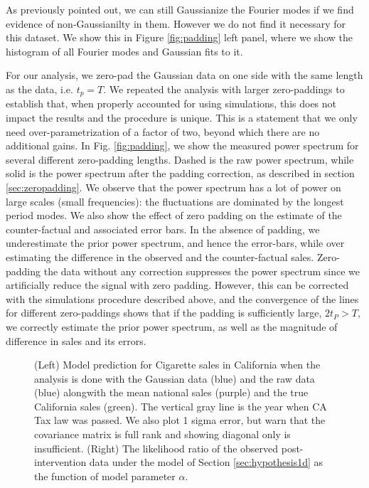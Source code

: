 \documentclass{article}
\newcommand\US[1]{\textcolor{red}{(US: #1)}}
\begin{document}
As previously pointed out, we can still Gaussianize the Fourier modes if we find evidence of non-Gaussianilty in them.
However we do not find it necessary for this dataset. We show this in Figure \ref{fig:padding} left panel, where we show the 
histogram %
of all Fourier modes and Gaussian fits to it. 

For our analysis, we zero-pad the Gaussian data on one side with the same length as the data, i.e. $t_p = T$. We repeated the analysis with larger zero-paddings to establish that, when properly accounted for using simulations, this does not impact the results and the procedure is unique. 
This is a statement that we only need over-parametrization of a factor of two, beyond
which there are no additional gains. 
In Fig. \ref{fig:padding}, we show the measured power spectrum
for several different zero-padding lengths. Dashed is the 
raw power spectrum, while solid is the power spectrum after 
the padding correction, as described in section \ref{sec:zeropadding}. 
We observe that the power spectrum has a lot of power on 
large scales (small frequencies): the fluctuations 
are dominated by the longest period modes. 
We also show the effect of zero padding on the estimate of the counter-factual and associated error bars. 
In the absence of padding, we underestimate the prior power spectrum, and hence the error-bars, while over estimating the difference in the observed and the counter-factual sales.  Zero-padding the data without any correction suppresses the power spectrum since we artificially reduce the signal with 
zero padding. However, this can be corrected with the simulations procedure described above, and the convergence of the lines for different zero-paddings shows that if the padding is sufficiently large, $2t_P>T$, we correctly estimate the prior power spectrum, as well as the magnitude of difference in sales and its errors. 


\begin{figure}
    \centering
    \caption{(Left) Model prediction for Cigarette sales in California when the analysis is done with the Gaussian data (blue) and the raw data (blue) alongwith the mean national sales (purple) and the true California sales (green). The vertical gray line is the year when CA Tax law was passed.
    We also plot 1 sigma error, but warn that the covariance matrix is full rank and showing diagonal only is insufficient.
    (Right) The likelihood ratio of the observed post-intervention data under the model of Section \ref{sec:hypothesis1d} as the function of model parameter $\alpha$.}
\label{fig:predict}
\end{figure}
\end{document}
